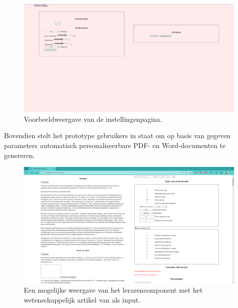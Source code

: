 \begin{center}
	\begin{figure}[H]
		\includegraphics[width=\linewidth]{img/website-instellingen.png}
		\caption{Voorbeeldweergave van de instellingenpagina.}
		\label{img:website-instellingen}
	\end{figure}
\end{center}

Bovendien stelt het prototype gebruikers in staat om op basis van gegeven parameters automatisch personaliseerbare PDF- en Word-documenten te genereren.

\begin{figure}
	\includegraphics[width=\linewidth]{img/proto-lerarencomponent.png}
	\caption{Een mogelijke weergave van het lerarencomponent met het wetenschappelijk artikel van \textcite{VanBrakel2022} als input.}
	\label{img:proto-lerarencomponent}
\end{figure}

